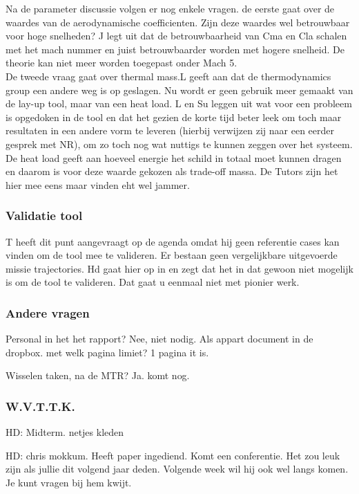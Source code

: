 Na de parameter discussie volgen er nog enkele vragen. de eerste gaat over de waardes van de aerodynamische coefficienten. Zijn deze waardes wel betrouwbaar voor hoge snelheden? J legt uit dat de betrouwbaarheid van Cma en Cla schalen met het mach nummer en juist betrouwbaarder worden met hogere snelheid. De theorie kan niet meer worden toegepast onder Mach 5.\\

De tweede vraag gaat over thermal mass.L geeft aan dat de thermodynamics group een andere weg is op geslagen. Nu wordt er geen gebruik meer gemaakt van de lay-up tool, maar van een heat load. L en Su leggen uit wat voor een probleem is opgedoken in de tool en dat het gezien de korte tijd beter leek om toch maar resultaten in een andere vorm te leveren (hierbij verwijzen zij naar een eerder gesprek met NR), om zo toch nog wat nuttigs te kunnen zeggen over het systeem. De heat load geeft aan hoeveel energie het schild in totaal moet kunnen dragen en daarom is voor deze waarde gekozen als trade-off massa. De Tutors zijn het hier mee eens maar vinden eht wel jammer.\\


\subsubsection{Validatie tool}
T heeft dit punt aangevraagt op de agenda omdat hij geen referentie cases kan vinden om de tool mee te valideren. Er bestaan geen vergelijkbare uitgevoerde missie trajectories. Hd gaat hier op in en zegt dat het in dat gewoon niet mogelijk is om de tool te valideren. Dat gaat u eenmaal niet met pionier werk.

\subsubsection{Andere vragen}
Personal in het het rapport? Nee, niet nodig. Als appart document in de dropbox. met welk pagina limiet? 1 pagina it is.

Wisselen taken, na de MTR? Ja. komt nog.

\subsubsection{W.V.T.T.K.}
HD: Midterm. netjes kleden

HD: chris mokkum. Heeft paper ingediend. Komt een conferentie. Het zou leuk zijn als jullie dit volgend jaar deden. Volgende week wil hij ook wel langs komen. Je kunt vragen bij hem kwijt. 

